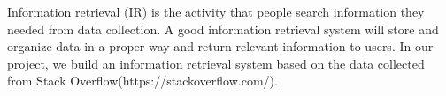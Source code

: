 \documentclass[10pt,journal,compsoc]{IEEEtran}
\begin{document}

\maketitle


\IEEEdisplaynontitleabstractindextext



%
\IEEEpeerreviewmaketitle



Information retrieval  (IR) is the activity that people search information they needed from data collection. A good information retrieval system will store and organize data in a proper way and return relevant information to users. In our project, we build an information retrieval system based on the data collected from Stack Overflow(https://stackoverflow.com/).
\end{document}
